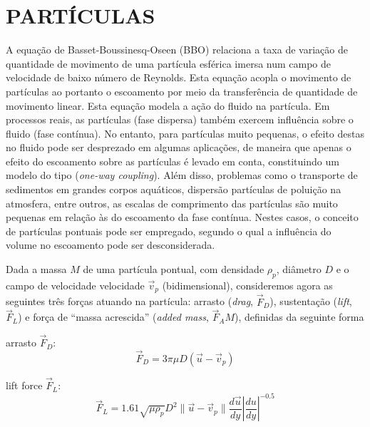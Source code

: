 \typeout{ ====================================================================}
\typeout{ ====================================================================}

\section{PARTÍCULAS}

A equação de Basset-Boussinesq-Oseen (BBO) relaciona a taxa de variação de quantidade de movimento de uma partícula esférica imersa num campo de velocidade de baixo número de Reynolds. Esta equação acopla o movimento de partículas ao portanto o escoamento por meio da transferência de quantidade de movimento linear. Esta equação modela a ação do fluido na partícula. Em processos reais, as partículas (fase dispersa) também exercem influência sobre o fluido (fase contínua). No entanto, para partículas muito pequenas, o efeito destas no fluido pode ser desprezado em algumas aplicações, de maneira que apenas o efeito do escoamento sobre as partículas é levado em conta, constituindo um modelo do tipo ({\it one-way coupling}). Além disso, problemas como o transporte de sedimentos em grandes corpos aquáticos, dispersão partículas de poluição na atmosfera, entre outros, as escalas de comprimento das partículas são muito pequenas em relação às do escoamento da fase contínua. Nestes casos, o conceito de partículas pontuais pode ser empregado, segundo o qual a influência do volume no escoamento pode ser desconsiderada.

Dada a massa $M$ de uma partícula pontual, com densidade $\rho_p$, diâmetro $D$ e o campo de velocidade velocidade $\vec{v}_p$ (bidimensional), consideremos agora as seguintes três forças atuando na partícula: arrasto ({\it drag}, $\vec{F}_D$), sustentação ({\it lift}, $\vec{F}_L$) e força de ``massa acrescida'' ({\it added mass}, $\vec{F}_AM$), definidas da seguinte forma

arrasto $\vec{F}_D$:
\begin{equation}
\vec{F}_D = 3\pi\mu D(\vec{u}-\vec{v}_p)
\end{equation}

lift force $\vec{F}_L$:
\begin{equation}
\vec{F}_L = 1.61\sqrt{\mu\rho_p}D^2\parallel\vec{u}-\vec{v}_p\parallel\frac{d\vec{u}}{dy}\left|\frac{du}{dy}\right|^{-0.5}
\end{equation}

